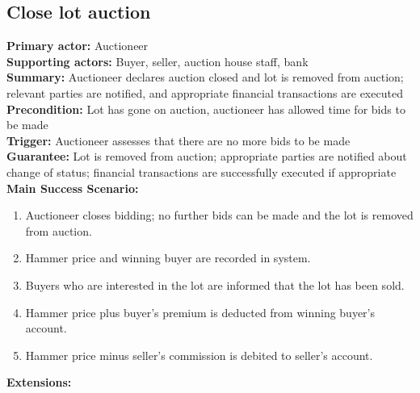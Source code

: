 \documentclass[titlepage, 12pt]{extarticle}
\begin{document}
\subsection{Close lot auction}
{\bf Primary actor: } Auctioneer 
\\{\bf Supporting actors: } Buyer, seller, auction house staff, bank
\\{\bf Summary: } Auctioneer declares auction closed and lot is removed from auction; relevant parties are notified, and appropriate financial transactions are executed
\\{\bf Precondition: } Lot has gone on auction, auctioneer has allowed time for bids to be made
\\{\bf Trigger: } Auctioneer assesses that there are no more bids to be made
\\{\bf Guarantee: } Lot is removed from auction; appropriate parties are notified about change of status; financial transactions are successfully executed if appropriate
\\{\bf Main Success Scenario: }
\begin{enumerate}
\item Auctioneer closes bidding; no further bids can be made and the lot is removed from auction.
\item Hammer price and winning buyer are recorded in system.
\item Buyers who are interested in the lot are informed that the lot has been sold.
\item Hammer price plus buyer's premium is deducted from winning buyer's account. 
\item Hammer price minus seller's commission is debited to seller's account. 
\end{enumerate}
\newpage \noindent
{\bf Extensions: }
\end{document}
